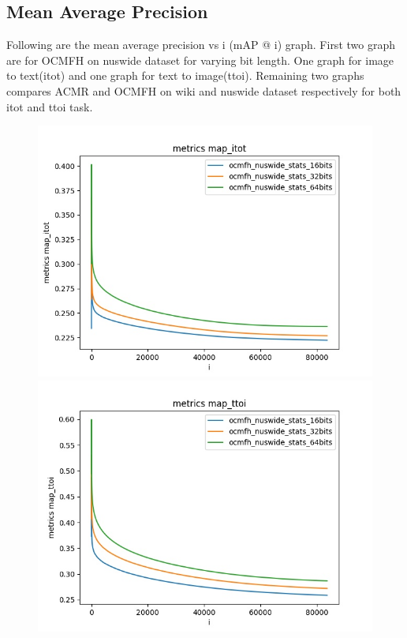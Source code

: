 \subsection{Mean Average Precision}
    Following are the mean average precision vs i (mAP @ i) graph. First two graph are for OCMFH\cite{ocmfh} on nuswide dataset for varying bit length. One graph for image to text(itot) and one graph for text to image(ttoi). Remaining two graphs compares ACMR\cite{acmr} and OCMFH\cite{ocmfh} on wiki and nuswide dataset respectively for both itot and ttoi task.
        \begin{figure}[H]
            \begin{minipage}[!h]{0.6\linewidth}
                \centering
                \includegraphics[width=\linewidth]{resultsImages/map/metrics map_itot_ocmfh_nuswide.jpeg}
            \end{minipage}
            \begin{minipage}[!h]{0.6\linewidth}
                \centering
                \includegraphics[width=\linewidth]{resultsImages/map/metrics map_ttoi_ocmfh_nuswide.jpeg}

\end{minipage}
\end{figure}
